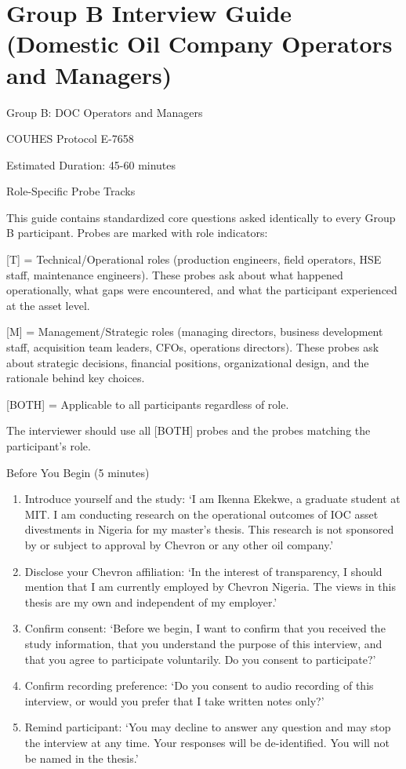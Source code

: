 \documentclass[twoside,fontset=lmodern]{mitthesis}
\begin{document}
\hypertarget{group-b-interview-guide-domestic-oil-company-operators-and-managers}{%
\section{Group B Interview Guide (Domestic Oil Company Operators and
Managers)}\label{group-b-interview-guide-domestic-oil-company-operators-and-managers}}

Group B: DOC Operators and Managers

COUHES Protocol E-7658

Estimated Duration: 45-60 minutes

Role-Specific Probe Tracks

This guide contains standardized core questions asked identically to
every Group B participant. Probes are marked with role indicators:

{[}T{]} = Technical/Operational roles (production engineers, field
operators, HSE staff, maintenance engineers). These probes ask about
what happened operationally, what gaps were encountered, and what the
participant experienced at the asset level.

{[}M{]} = Management/Strategic roles (managing directors, business
development staff, acquisition team leaders, CFOs, operations
directors). These probes ask about strategic decisions, financial
positions, organizational design, and the rationale behind key choices.

{[}BOTH{]} = Applicable to all participants regardless of role.

The interviewer should use all {[}BOTH{]} probes and the probes matching
the participant's role.

Before You Begin (5 minutes)

\begin{enumerate}
\def\labelenumi{\arabic{enumi}.}
\item
  Introduce yourself and the study: `I am Ikenna Ekekwe, a graduate
  student at MIT. I am conducting research on the operational outcomes
  of IOC asset divestments in Nigeria for my master's thesis. This
  research is not sponsored by or subject to approval by Chevron or any
  other oil company.'
\item
  Disclose your Chevron affiliation: `In the interest of transparency, I
  should mention that I am currently employed by Chevron Nigeria. The
  views in this thesis are my own and independent of my employer.'
\item
  Confirm consent: `Before we begin, I want to confirm that you received
  the study information, that you understand the purpose of this
  interview, and that you agree to participate voluntarily. Do you
  consent to participate?'
\item
  Confirm recording preference: `Do you consent to audio recording of
  this interview, or would you prefer that I take written notes only?'
\item
  Remind participant: `You may decline to answer any question and may
  stop the interview at any time. Your responses will be de-identified.
  You will not be named in the thesis.'
\end{enumerate}
\end{document}
